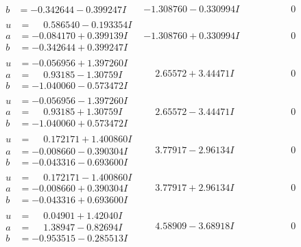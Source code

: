 \documentclass[1p]{elsarticle_modified}
\theoremstyle{definition}
\begin{document}
$$\begin{array}{c|c|c}
\begin{aligned}
b &= -0.342644 - 0.399247 I\end{aligned}
 & -1.308760 - 0.330994 I & \phantom{-0.000000 } 0 \\ \hline\begin{aligned}
u &= \phantom{-}0.586540 - 0.193354 I \\
a &= -0.084170 + 0.399139 I \\
b &= -0.342644 + 0.399247 I\end{aligned}
 & -1.308760 + 0.330994 I & \phantom{-0.000000 } 0 \\ \hline\begin{aligned}
u &= -0.056956 + 1.397260 I \\
a &= \phantom{-}0.93185 - 1.30759 I \\
b &= -1.040060 - 0.573472 I\end{aligned}
 & \phantom{-}2.65572 + 3.44471 I & \phantom{-0.000000 } 0 \\ \hline\begin{aligned}
u &= -0.056956 - 1.397260 I \\
a &= \phantom{-}0.93185 + 1.30759 I \\
b &= -1.040060 + 0.573472 I\end{aligned}
 & \phantom{-}2.65572 - 3.44471 I & \phantom{-0.000000 } 0 \\ \hline\begin{aligned}
u &= \phantom{-}0.172171 + 1.400860 I \\
a &= -0.008660 - 0.390304 I \\
b &= -0.043316 - 0.693600 I\end{aligned}
 & \phantom{-}3.77917 - 2.96134 I & \phantom{-0.000000 } 0 \\ \hline\begin{aligned}
u &= \phantom{-}0.172171 - 1.400860 I \\
a &= -0.008660 + 0.390304 I \\
b &= -0.043316 + 0.693600 I\end{aligned}
 & \phantom{-}3.77917 + 2.96134 I & \phantom{-0.000000 } 0 \\ \hline\begin{aligned}
u &= \phantom{-}0.04901 + 1.42040 I \\
a &= \phantom{-}1.38947 - 0.82694 I \\
b &= -0.953515 - 0.285513 I\end{aligned}
 & \phantom{-}4.58909 - 3.68918 I & \phantom{-0.000000 } 0 \\ \hline\begin{aligned}

\end{aligned}
\end{array}$$
\end{document}
